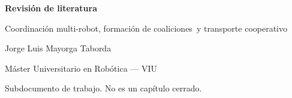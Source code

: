 \documentclass[12pt,a4paper]{article}
\begin{document}
\begin{center}
  {\LARGE\bfseries Revisión de literatura\par}
  \vspace{2mm}
  {\large Coordinación multi-robot, formación de coaliciones\
   y transporte cooperativo\par}
  \vspace{4mm}
  {\normalsize Jorge Luis Mayorga Taborda\par}
  {\footnotesize Máster Universitario en Robótica --- VIU\par}
  {\footnotesize Subdocumento de trabajo. No es un capítulo cerrado.\par}
\end{center}

\vspace{4mm}
\tableofcontents
\vspace{6mm}









\printbibliography[title={Referencias}]
\end{document}

